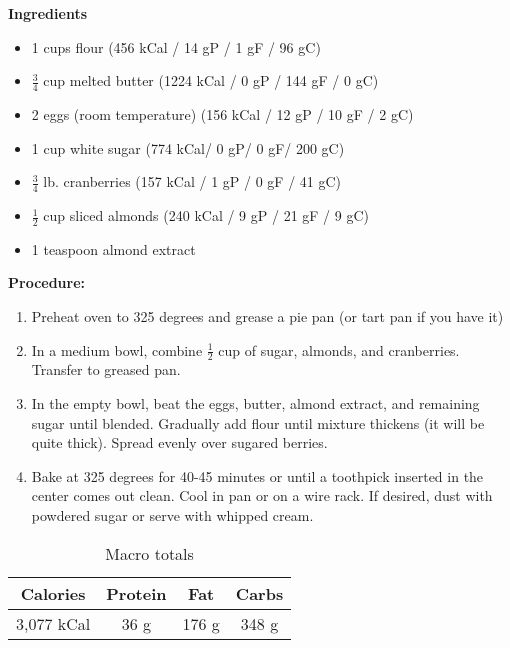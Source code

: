 \documentclass{report}
\begin{document}


\bigskip

\bigskip

\begin{multicols}{2}
\textbf{Ingredients}
\begin{itemize}
\item 1 cups flour \quad (456 kCal / 14 gP / 1 gF / 96 gC)
\item $\frac{3}{4}$ cup melted butter (1224 kCal / 0 gP / 144 gF / 0 gC)
\item 2 eggs (room temperature)  \quad \newline (156 kCal / 12 gP / 10 gF / 2 gC)
\item 1 cup white sugar (774 kCal/ 0 gP/ 0 gF/ 200 gC)
\item $\frac{3}{4}$ lb. cranberries \quad (157 kCal / 1 gP / 0 gF / 41 gC)
\item $\frac{1}{2}$ cup sliced almonds \quad \newline(240 kCal / 9 gP / 21 gF / 9 gC)
\item 1 teaspoon almond extract 




\end{itemize}


\columnbreak
\textbf{Procedure:}
\medskip


\begin{enumerate}
\item Preheat oven to 325 degrees and grease a pie pan (or tart pan if you have it)


\medskip
\item In a medium bowl, combine $\frac{1}{2}$ cup of sugar, almonds, and cranberries. Transfer to greased pan.  
\medskip

\item In the empty bowl, beat the eggs, butter, almond extract, and remaining sugar until blended. Gradually add flour until mixture thickens (it will be quite thick). Spread evenly over sugared berries. 
\newline 

 \item Bake at 325 degrees for 40-45 minutes or until a toothpick inserted in the center comes out clean. Cool in pan or on a wire rack. If desired, dust with powdered sugar or serve with whipped cream. 
\end{enumerate}
\begin{table}[H]
  \begin{center}
    \caption{Macro totals}
    \label{tab:table1}
    \begin{tabular}{c|c|c|c} %
      \textbf{Calories} & \textbf{Protein} & \textbf{Fat} & \textbf{Carbs}\\
      \hline
      3,077 kCal & 36 g & 176 g & 348 g\\
    \end{tabular}
  \end{center}
\end{table}
\end{multicols}



\end{document}
